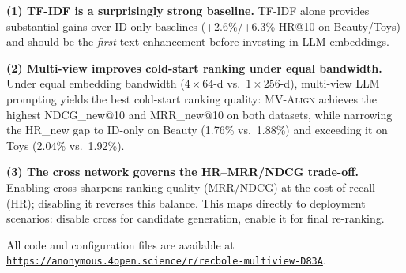 \documentclass[sigconf,natbib=true,anonymous]{acmart}
\newcommand{\model}{\textsc{MV-Align}\xspace}
\newcommand{\tfidf}{\textsc{TF-IDF}\xspace}
\newcommand{\llm}{\textsc{LLM}\xspace}
\begin{document}
\textbf{(1) TF-IDF is a surprisingly strong baseline.}
\tfidf alone provides substantial gains over ID-only baselines
(+2.6\%/+6.3\% HR@10 on Beauty/Toys) and should be the
\emph{first} text enhancement before investing in \llm embeddings.

\textbf{(2) Multi-view improves cold-start ranking under equal bandwidth.}
Under equal embedding bandwidth ($4{\times}64$-d vs.\ $1{\times}256$-d),
multi-view \llm prompting yields the best cold-start ranking quality:
\model achieves the highest NDCG\_new@10 and MRR\_new@10 on both
datasets, while narrowing the HR\_new gap to ID-only on Beauty
(1.76\% vs.\ 1.88\%) and exceeding it on Toys
(2.04\% vs.\ 1.92\%).

\textbf{(3) The cross network governs the HR--MRR/NDCG trade-off.}
Enabling cross sharpens ranking quality (MRR/NDCG) at the cost of
recall (HR); disabling it reverses this balance. This maps directly
to deployment scenarios: disable cross for candidate generation,
enable it for final re-ranking.

\smallskip\noindent
All code and configuration files are available at
\texttt{\url{https://anonymous.4open.science/r/recbole-multiview-D83A}}.




\end{document}
